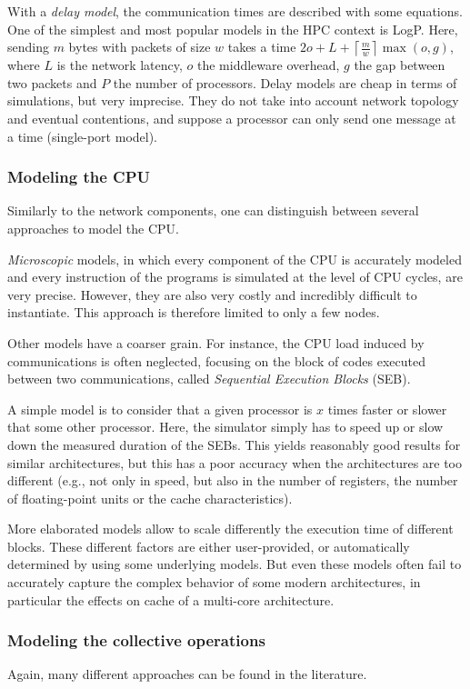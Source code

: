 \documentclass[12pt, a4paper]{memoir}
\begin{document}
With a \emph{delay model}, the communication times are described with some equations. One of the simplest and most popular
models in the HPC context is LogP\cite{Culler_1993}. Here, sending \(m\) bytes with packets of size \(w\) takes a time
\(2o + L + \left\lceil\frac{m}{w}\right\rceil\max(o, g)\), where \(L\) is the network latency, \(o\) the middleware
overhead, \(g\) the gap between two packets and \(P\) the number of processors. Delay models are cheap in terms of
simulations, but very imprecise. They do not take into account network topology and eventual contentions, and
suppose a processor can only send one message at a time (single-port model).
\subsubsection{Modeling the CPU}
\label{sec:org7381750}
Similarly to the network components, one can distinguish between several approaches to model the CPU.

\emph{Microscopic} models, in which every component of the CPU is accurately modeled and every instruction of the programs
is simulated at the level of CPU cycles, are very precise. However, they are also very costly and incredibly
difficult to instantiate. This approach is therefore limited to only a few nodes.

Other models have a coarser grain. For instance, the CPU load induced by communications is often neglected,
focusing on the block of codes executed between two communications, called \emph{Sequential Execution Blocks} (SEB).

A simple model is to consider that a given processor is \(x\) times faster or slower that some other
processor. Here, the simulator simply has to speed up or slow down the measured duration of the SEBs. This yields
reasonably good results for similar architectures, but this has a poor accuracy when the architectures are too
different (e.g., not only in speed, but also in the number of registers, the number of floating-point units or the
cache characteristics).

More elaborated models allow to scale differently the execution time of different blocks. These different factors
are either user-provided, or automatically determined by using some underlying models. But even these models often
fail to accurately capture the complex behavior of some modern architectures, in particular the effects on cache of
a multi-core architecture.
\subsubsection{Modeling the collective operations}
\label{sec:org1430c9d}
Again, many different approaches can be found in the literature.
\end{document}
